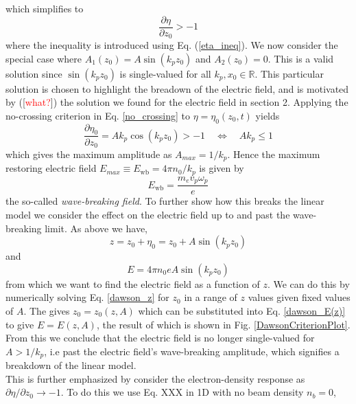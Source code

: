 \documentclass[%
onecolumn, notitlepage,
 amsmath,amssymb,
 aps,
]{article}
\begin{document}
\begin{itemize}
\begin{equation}
\end{equation}
which simplifies to
\begin{equation}
\frac{\partial \eta}{\partial z_0}>-1
\label{no_crossing}
\end{equation}
where the inequality is introduced using Eq. (\ref{eta_ineq}). We now consider the special case where $A_1(z_0)=A\sin(k_pz_0)$ and $A_2(z_0)=0$. This is a valid solution since $\sin(k_pz_0)$ is single-valued for all $k_p,x_0\in\mathbb{R}$. This particular solution is chosen to highlight the breadown of the electric field, and is motivated by ([\textcolor{red}{what?}]) the solution we found for the electric field in section 2. Applying the no-crossing criterion in Eq. \ref{no_crossing} to $\eta=\eta_0(z_0,t)$ yields
\begin{equation}
\frac{\partial \eta_0}{\partial z_0}=Ak_p\cos(k_pz_0)>-1 \quad \Leftrightarrow \quad Ak_p\leq 1
\end{equation}
which gives the maximum amplitude as $A_{max}=1/k_p$. Hence the maximum restoring electric field $E_{max}\equiv E_{\text{wb}}=4\pi n_0/k_p$ is given by
\begin{equation}
E_{\text{wb}}=\frac{m_ev_p\omega_p}{e}
\end{equation}
the so-called \textit{wave-breaking field}. To further show how this breaks the linear model we consider the effect on the electric field up to and past the wave-breaking limit. As above we have, 
\begin{equation}
z=z_0+\eta_0=z_0+A\sin(k_p z_0)
\label{dawson_z}
\end{equation}
and 
\begin{equation}
E=4\pi n_0e A\sin(k_p z_0)
\label{dawson_E(z)}
\end{equation}
from which we want to find the electric field as a function of $z$. We can do this by numerically solving Eq. \ref{dawson_z} for $z_0$ in a range of $z$ values given fixed values of $A$. The gives $z_0=z_0(z,A)$ which can be substituted into Eq. \ref{dawson_E(z)} to give $E=E(z,A)$, the result of which is shown in Fig. \ref{DawsonCriterionPlot}. From this we conclude that the electric field is no longer single-valued for $A>1/k_p$, i.e past the electric field's wave-breaking amplitude, which signifies a breakdown of the linear model.\\
This is further emphasized by consider the electron-density response as $\partial \eta/\partial z_0\to -1$. To do this we use  Eq. XXX in 1D with no beam density $n_b=0$, 
\begin{equation}

\end{equation}
\end{itemize}
\end{document}
